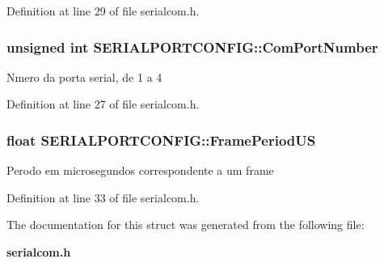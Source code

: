 Definition at line 29 of file serialcom.h.
\subsubsection[{ComPortNumber}]{\setlength{\rightskip}{0pt plus 5cm}unsigned int {\bf SERIALPORTCONFIG::ComPortNumber}}\label{structSERIALPORTCONFIG_afdab9b8ca1ed50f3970ac4d7215366e1}
Nmero da porta serial, de 1 a 4 

Definition at line 27 of file serialcom.h.
\subsubsection[{FramePeriodUS}]{\setlength{\rightskip}{0pt plus 5cm}float {\bf SERIALPORTCONFIG::FramePeriodUS}}\label{structSERIALPORTCONFIG_ae5c4edc520a9a85a82daada36fb4ea40}
Perodo em microsegundos correspondente a um frame 

Definition at line 33 of file serialcom.h.

The documentation for this struct was generated from the following file:\begin{DoxyCompactItemize}
\item 
{\bf serialcom.h}\end{DoxyCompactItemize}
